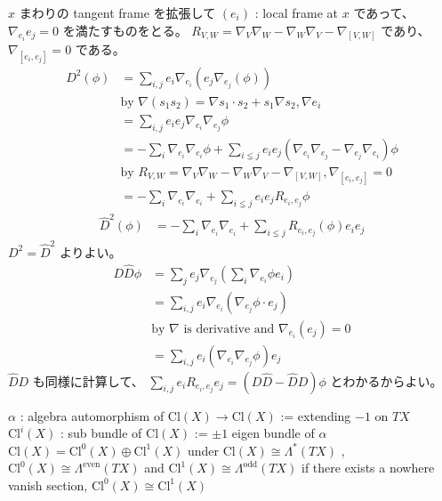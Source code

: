 \begin{Proof}
\itemprof
  \(x\) まわりの tangent frame を拡張して \((e_i)\) : local frame at \(x\) であって、 \(\nabla_{e_i} e_j = 0\) を満たすものをとる。
  \(R_{V ,W} = \nabla_V \nabla_W - \nabla_W \nabla_V - \nabla_{[V , W]}\) であり、 \(\nabla_{[e_i , e_j]} = 0\) である。
  \begin{align*}
    D^2(\phi)
    &=\sum_{i,j} e_i \nabla_{e_i}(e_j \nabla_{e_j}(\phi)) \\
    &\text{by } \nabla(s_1 s_2) = \nabla s_1 \cdot s_2 + s_1 \nabla s_2 , \nabla e_i \\
    &=\sum_{i,j} e_i e_j \nabla_{e_i} \nabla_{e_j} \phi \\
    &= -\sum_i \nabla_{e_i} \nabla_{e_i} \phi + \sum_{i \lneq j} e_i e_j (\nabla_{e_i} \nabla_{e_j} - \nabla_{e_j} \nabla_{e_i}) \phi \\
    &\text{by } R_{V ,W} = \nabla_V \nabla_W - \nabla_W \nabla_V - \nabla_{[V , W]} , \nabla_{[e_i , e_j]} = 0 \\
    &= - \sum_i \nabla_{e_i} \nabla_{e_i} + \sum_{i \lneq j} e_i e_j R_{e_i , e_j} \phi
  \end{align*}
  \begin{align*}
    \hat{D}^2(\phi)
    &= - \sum_i \nabla_{e_i} \nabla_{e_i} + \sum_{i \lneq j} R_{e_i , e_j} (\phi) e_i e_j
  \end{align*}
  \(D^2 = \hat{D}^2\) よりよい。
\itemprof
  \begin{align*}
    D \hat{D} \phi
    &= \sum_j e_j \nabla_{e_j} (\sum_i \nabla_{e_i} \phi e_i) \\
    &= \sum_{i,j} e_i \nabla_{e_i} (\nabla_{e_j} \phi \cdot e_j) \\
    &\text{by } \nabla \text{ is derivative and } \nabla_{e_i} (e_j) = 0 \\
    &= \sum_{i,j} e_i (\nabla_{e_i} \nabla_{e_j} \phi) e_j
  \end{align*}
  \(\hat{D}D\) も同様に計算して、 \(\sum_{i,j} e_i R_{e_i , e_j} e_j = (D \hat{D} - \hat{D} D )\phi\) とわかるからよい。
\end{Proof}

\begin{Theorem}
\itemdefi
  \Define \(\alpha\) : algebra automorphism of \(\text{Cl}(X) \to \text{Cl}(X)\) := extending \(-1\) on \(TX\) \\
  \Define \(\text{Cl}^i(X)\) : sub bundle of \(\text{Cl}(X)\) := \(\pm 1\) eigen bundle of \(\alpha\)
\itemprop 
  \(\text{Cl}(X) = \text{Cl}^0(X) \oplus \text{Cl}^1(X)\)
\itemprop
  under \(\text{Cl}(X) \cong \Lambda^*(TX)\) , \(\text{Cl}^0(X) \cong \Lambda^{\text{even}}(TX)\) and \(\text{Cl}^1(X) \cong \Lambda^{\text{odd}}(TX)\)
\itemprop
  if there exists a nowhere vanish section, \(\text{Cl}^0(X) \cong \text{Cl}^1(X)\)
\end{Theorem}

